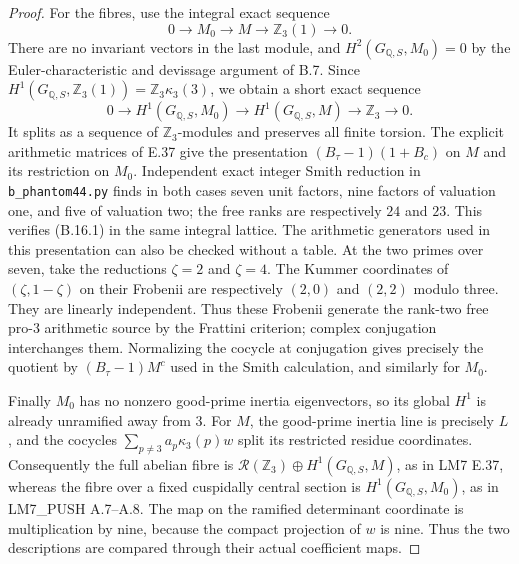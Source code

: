 \begin{proof}
For the fibres, use the integral exact sequence
\[
 0\longrightarrow M_0\longrightarrow M\longrightarrow
                       \mathbb Z_3(1)\longrightarrow0.
\]
There are no invariant vectors in the last module, and
$H^2(G_{\mathbb Q,S},M_0)=0$ by the Euler-characteristic and
devissage argument of B.7. Since
$H^1(G_{\mathbb Q,S},\mathbb Z_3(1))=
\mathbb Z_3\kappa_3(3)$, we obtain a short exact sequence
\[
 0\to H^1(G_{\mathbb Q,S},M_0)\to H^1(G_{\mathbb Q,S},M)
                         \to\mathbb Z_3\to0.
\]
It splits as a sequence of $\mathbb Z_3$-modules and preserves
all finite torsion. The explicit arithmetic matrices of E.37
give the presentation $(B_\tau-1)(1+B_c)$ on $M$ and its
restriction on $M_0$. Independent exact integer Smith
reduction in \texttt{b\_phantom44.py} finds in both cases seven
unit factors, nine factors of valuation one, and five of
valuation two; the free ranks are respectively $24$ and $23$.
This verifies (B.16.1) in the same integral lattice.
The arithmetic generators used in this presentation can also
be checked without a table. At the two primes over seven, take
the reductions $\zeta=2$ and $\zeta=4$. The Kummer coordinates
of $(\zeta,1-\zeta)$ on their Frobenii are respectively
$(2,0)$ and $(2,2)$ modulo three. They are linearly independent.
Thus these Frobenii generate the rank-two free pro-$3$
arithmetic source by the Frattini criterion; complex conjugation
interchanges them. Normalizing the cocycle at conjugation gives
precisely the quotient by $(B_\tau-1)M^c$ used in the Smith
calculation, and similarly for $M_0$.

Finally $M_0$ has no nonzero good-prime inertia eigenvectors,
so its global $H^1$ is already unramified away from $3$.
For $M$, the good-prime inertia line is precisely $L$, and the
cocycles $\sum_{p\ne3}a_p\kappa_3(p)w$ split its restricted
residue coordinates. Consequently the full abelian fibre is
$\mathcal R(\mathbb Z_3)\oplus H^1(G_{\mathbb Q,S},M)$,
as in LM7 E.37, whereas the fibre over a fixed cuspidally
central section is $H^1(G_{\mathbb Q,S},M_0)$, as in
LM7\_PUSH A.7--A.8. The map on the ramified determinant
coordinate is multiplication by nine, because the compact
projection of $w$ is nine. Thus the two descriptions are
compared through their actual coefficient maps.
\end{proof}

